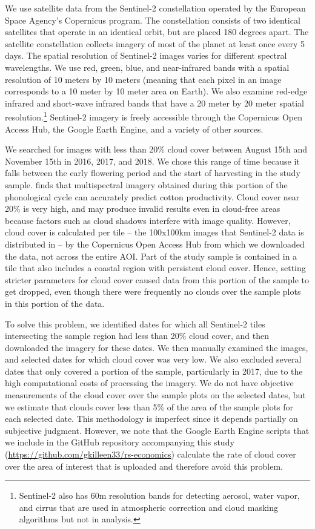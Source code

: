 \documentclass{article}
\begin{document}
We use satellite data from the Sentinel-2 constellation operated by the European Space Agency’s Copernicus program. The constellation consists of two identical satellites that operate in an identical orbit, but are placed 180 degrees apart. The satellite constellation collects imagery of most of the planet at least once every 5 days. The spatial resolution of Sentinel-2 images varies for different spectral wavelengths. We use red, green, blue, and near-infrared bands with a spatial resolution of 10 meters by 10 meters (meaning that each pixel in an image corresponds to a 10 meter by 10 meter area on Earth). We also examine red-edge infrared and short-wave infrared bands that have a 20 meter by 20 meter spatial resolution.\footnote{Sentinel-2 also has 60m resolution bands for detecting aerosol, water vapor, and cirrus that are used in atmospheric correction and cloud masking algorithms but not in analysis.} Sentinel-2 imagery is freely accessible through the Copernicus Open Access Hub, the Google Earth Engine, and a variety of other sources. 

We searched for images with less than 20\% cloud cover between August 15th and November 15th in 2016, 2017, and 2018. We chose this range of time because it falls between the early flowering period and the start of harvesting in the study sample. \citet{Zhao2007CanopyPrediction} finds that multispectral imagery obtained during this portion of the phonological cycle can accurately predict cotton productivity. Cloud cover near 20\% is very high, and may produce invalid results even in cloud-free areas because factors such as cloud shadows interfere with image quality. However, cloud cover is calculated per tile -- the 100x100km images that Sentinel-2 data is distributed in -- by the Copernicus Open Access Hub from which we downloaded the data, not across the entire AOI. Part of the study sample is contained in a tile that also includes a coastal region with persistent cloud cover. Hence, setting stricter parameters for cloud cover caused data from this portion of the sample to get dropped, even though there were frequently no clouds over the sample plots in this portion of the data. 

To solve this problem, we identified dates for which all Sentinel-2 tiles intersecting the sample region had less than 20\% cloud cover, and then downloaded the imagery for these dates. We then manually examined the images, and selected dates for which cloud cover was very low. We also excluded several dates that only covered a portion of the sample, particularly in 2017, due to the high computational costs of processing the imagery. We do not have objective measurements of the cloud cover over the sample plots on the selected dates, but we estimate that clouds cover less than 5\% of the area of the sample plots for each selected date. This methodology is imperfect since it depends partially on subjective judgment. However, we note that the Google Earth Engine scripts that we include in the GitHub repository accompanying this study (\url{https://github.com/gkilleen33/rs-economics}) calculate the rate of cloud cover over the area of interest that is uploaded and therefore avoid this problem. 
\end{document}
